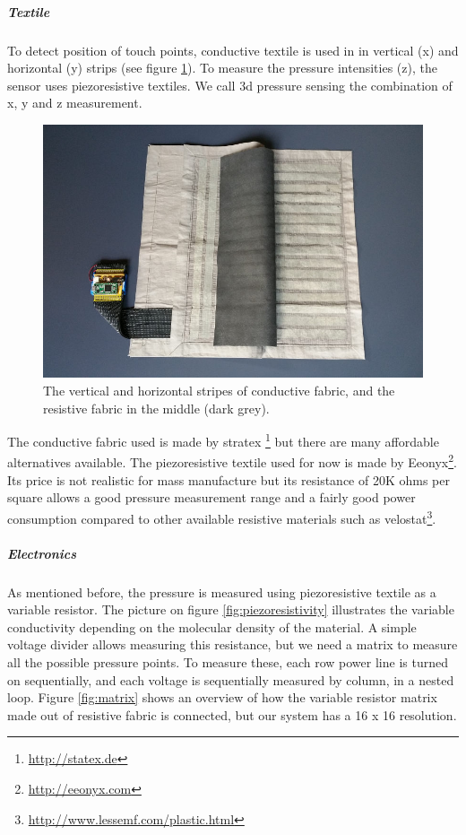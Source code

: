 \documentclass{sigchi-ext}
\begin{document}
\subparagraph{Textile}

To detect position of touch points, conductive textile is used in in vertical (x) and horizontal (y) strips (see figure \ref{fig:inside}).
To measure the pressure intensities (z), the sensor uses piezoresistive textiles. We call 3d pressure sensing the combination of x, y and z measurement.

\begin{figure}[h!]
    \centering
    \includegraphics[width=\columnwidth]{figures/inside}
    \caption{The vertical and horizontal stripes of conductive fabric,
    and the resistive fabric in the middle (dark grey).}\label{fig:inside}
\end{figure}

The conductive fabric used is made by stratex \footnote{\url{http://statex.de}} but there are many affordable alternatives available.
The piezoresistive textile used for now is made by Eeonyx\footnote{\url{http://eeonyx.com}}. Its price is not realistic for mass manufacture but its resistance of 20K ohms per square allows a good pressure measurement range and a fairly good power consumption compared to other available resistive materials such as velostat\footnote{\url{http://www.lessemf.com/plastic.html}}.


\subparagraph{Electronics}

As mentioned before, the pressure is measured using piezoresistive textile as a variable resistor. The picture on figure \ref{fig:piezoresistivity} illustrates the variable conductivity depending on the molecular density of the material.
A simple voltage divider allows measuring this resistance, but we need a matrix to measure all the possible pressure points.
To measure these, each row power line is turned on sequentially, and each voltage is sequentially measured by column, in a nested loop.
Figure \ref{fig:matrix} shows an overview of how the variable resistor matrix made out of resistive fabric is connected, but our system has a 16 x 16 resolution.
\end{document}
